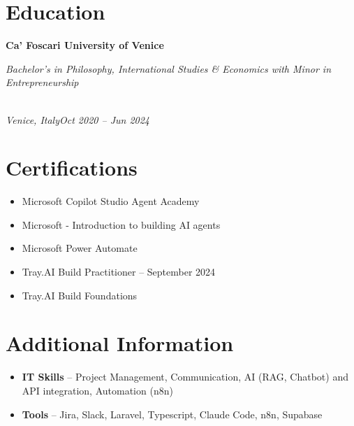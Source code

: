 \documentclass[a4paper,10pt]{article}
\newcommand{\role}[4]{\vspace{3pt}\noindent\hspace{0.6em}\parbox[t]{0.38\textwidth}{\raggedright\textbf{#1}}\hfill\parbox[t]{0.58\textwidth}{\raggedleft\textit{#2}}\\{\textit{#3}\hfill\textit{#4}}\vspace{1pt}}
\begin{document}
\section{Education}
\role{Ca' Foscari University of Venice}{Bachelor's in Philosophy, International Studies \& Economics with Minor in Entrepreneurship}{Venice, Italy}{Oct 2020 -- Jun 2024}

\section{Certifications}
\begin{itemize}
\item Microsoft Copilot Studio Agent Academy
\item Microsoft - Introduction to building AI agents
\item Microsoft Power Automate
\item Tray.AI Build Practitioner -- September 2024
\item Tray.AI Build Foundations
\end{itemize}

\section{Additional Information}
\begin{itemize}
\item \textbf{IT Skills} -- Project Management, Communication, AI (RAG, Chatbot) and API integration, Automation (n8n)
\item \textbf{Tools} -- Jira, Slack, Laravel, Typescript, Claude Code, n8n, Supabase
\end{itemize}
\end{document}

